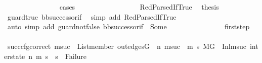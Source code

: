\begin{isabellebody}
\ \ \ \ \ \ \ \ \ \ \ \ \ \ \isamarkupfalse%
\ cases\isanewline
\ \ \ \ \ \ \ \ \ \ \ \ \ \ \ \ \isamarkupfalse%
\ RedParsedIfTrue\ \isamarkupfalse%
\ {\isacharquery}{\kern0pt}thesis\ \isamarkupfalse%
\ guard{\isacharunderscore}{\kern0pt}true\ bb{\isacharunderscore}{\kern0pt}successor{\isacharunderscore}{\kern0pt}if\ \isamarkupfalse%
\ {\isacharparenleft}{\kern0pt}simp\ add{\isacharcolon}{\kern0pt}\ RedParsedIfTrue{\isacharparenright}{\kern0pt}\isanewline
\ \ \ \ \ \ \ \ \ \ \ \ \ \ \isamarkupfalse%
\ {\isacharparenleft}{\kern0pt}auto\ simp\ add{\isacharcolon}{\kern0pt}\ guard{\isacharunderscore}{\kern0pt}not{\isacharunderscore}{\kern0pt}false\ bb{\isacharunderscore}{\kern0pt}successor{\isacharunderscore}{\kern0pt}if\ {}\ Some{\isacharparenright}{\kern0pt}\isanewline
\isanewline
\ \ \ \ \ \ \ \ \ \ \ \ \ \ \isamarkupfalse%
\ first{\isacharunderscore}{\kern0pt}step\ \isanewline
\ \ \ \ \ \ \ \ \ \ \ \ \ \ \isamarkupfalse%
\ succ{\isacharunderscore}{\kern0pt}cfg{\isacharunderscore}{\kern0pt}correct{\isacharcolon}{\kern0pt}\ {\isachardoublequoteopen}{\isacharparenleft}{\kern0pt}{\isasymforall}msuc{}{\isachardot}{\kern0pt}\ \ List{\isachardot}{\kern0pt}member\ {\isacharparenleft}{\kern0pt}out{\isacharunderscore}{\kern0pt}edges{\isacharparenleft}{\kern0pt}G{\isacharparenright}{\kern0pt}\ {\isacharbang}{\kern0pt}\ n{\isacharparenright}{\kern0pt}\ msuc{}\ {\isasymlongrightarrow}\ {\isacharparenleft}{\kern0pt}{\isasymforall}m{}\ s{}{\isachardot}{\kern0pt}\ {\isacharparenleft}{\kern0pt}{\isacharparenleft}{\kern0pt}M{\isacharcomma}{\kern0pt}{\isasymLambda}{\isacharcomma}{\kern0pt}{\isasymGamma}{\isacharcomma}{\kern0pt}{\isasymOmega}{\isacharcomma}{\kern0pt}G\ {\isasymturnstile}\ {\isacharparenleft}{\kern0pt}Inl{\isacharparenleft}{\kern0pt}msuc{}{\isacharparenright}{\kern0pt}{\isacharcomma}{\kern0pt}\ inter{\isacharunderscore}{\kern0pt}state{\isacharparenright}{\kern0pt}\ {\isacharminus}{\kern0pt}n{\isasymrightarrow}{\isacharasterisk}{\kern0pt}\ {\isacharparenleft}{\kern0pt}m{}{\isacharcomma}{\kern0pt}\ s{}{\isacharparenright}{\kern0pt}{\isacharparenright}{\kern0pt}\ {\isasymlongrightarrow}\ s{}\ {\isasymnoteq}\ Failure{\isacharparenright}{\kern0pt}{\isacharparenright}{\kern0pt}{\isacharparenright}{\kern0pt}{\isachardoublequoteclose}\isanewline
\ \ \ \ \ \ \ \ \ \ \ \ \ \ \isamarkupfalse%

\end{isabellebody}
